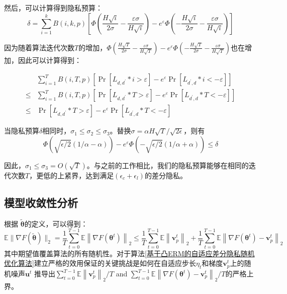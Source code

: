 然后，可以计算得到隐私预算：
\begin{equation}\label{eq:隐私预算计算2}
\delta=\sum_{i=1}^{k} B(i, k, p)\left[\Phi\left(\frac{H \sqrt{i}}{2 \sigma}-\frac{\varepsilon \sigma}{H \sqrt{i}}\right)-e^{\varepsilon} \Phi\left(-\frac{H \sqrt{i}}{2 \sigma}-\frac{\varepsilon \sigma}{H \sqrt{i}}\right)\right]
\end{equation}

因为随着算法迭代次数$T$的增加，$\Phi\left(\frac{H \sqrt{T}}{2 \sigma}-\frac{\varepsilon \sigma}{H \sqrt{T}}\right)-e^{\varepsilon} \Phi\left(-\frac{H \sqrt{T}}{2 \sigma}-\frac{\varepsilon \sigma}{H \sqrt{T}}\right)$也在增加，因此可以计算得到：

\begin{equation}\label{eq:隐私预算计算3}
\begin{aligned}
& \sum_{i=1}^{T} B(i, T, p)\left[\operatorname{Pr}\left[L_{d, d^{\prime}} * i>\varepsilon\right]-e^{\varepsilon} \operatorname{Pr}\left[L_{d^{\prime}, d} * i<-\varepsilon\right]\right] \\
\leq & \sum_{i=1}^{T} B(i, T, p)\left[\operatorname{Pr}\left[L_{d, d^{\prime}} * T>\varepsilon\right]-e^{\varepsilon} \operatorname{Pr}\left[L_{d^{\prime}, d} * T<-\varepsilon\right]\right] \\
\leq & \operatorname{Pr}\left[L_{d, d^{\prime}} * T>\varepsilon\right]-e^{\varepsilon} \operatorname{Pr}\left[L_{d^{\prime}, d} * T<-\varepsilon\right]
\end{aligned}
\end{equation}

当隐私预算$\delta$相同时，$\sigma_{1} \leq \sigma_{2} \leq \sigma_{3}$。替换$\sigma=\alpha H \sqrt{T} / \sqrt{2 \epsilon}$，则有
\begin{equation}\label{eq:隐私预算计算4}
\Phi(\sqrt{\epsilon / 2}(1 / \alpha-\alpha))-e^{\varepsilon} \Phi(-\sqrt{\epsilon / 2}(1 / \alpha+\alpha)) \leq \delta
\end{equation}

因此，$\sigma_{1} \leq \sigma_{3}=O(\sqrt{T})$。与之前的工作相比，我们的隐私预算能够在相同的迭代次数$T$，更低的上紧界，达到满足$\left(\epsilon_{c}+\epsilon_{l}\right)$的差分隐私。

\subsection{模型收敛性分析}
根据 $\widetilde{\boldsymbol{\theta}}$的定义，可以得到：
$$
\mathbb{E}\|\nabla F(\widetilde{\boldsymbol{\theta}})\|_{2}=\frac{1}{T} \sum_{t=0}^{T-1} \mathbb{E}\left\|\nabla F\left(\boldsymbol{\theta}^{t}\right)\right\|_{2} \leq \frac{1}{T} \sum_{t=0}^{T-1} \mathbb{E}\left\|\mathbf{v}_{p}^{t}\right\|_{2}+\frac{1}{T} \sum_{t=0}^{T-1} \mathbb{E}\left\|\nabla F\left(\boldsymbol{\theta}^{t}\right)-\mathbf{v}_{p}^{t}\right\|_{2}
$$
其中期望值覆盖算法的所有随机性。对于算法\ref{基于凸ERM的自适应差分隐私随机优化算法}建立严格的效用保证的关键挑战是如何在自适应步长$\eta_{t}$和梯度$\mathbf{v}_{p}^{t}$上的随机噪声$\mathbf{u}^{t}$
推导出$\sum_{t=0}^{T-1} \mathbb{E}\left\|\mathbf{v}_{p}^{t}\right\|_{2} / T$ and $\sum_{t=0}^{T-1} \mathbb{E}\left\|\nabla F\left(\boldsymbol{\theta}^{t}\right)-\mathbf{v}_{p}^{t}\right\|_{2} / T$的严格上界。

